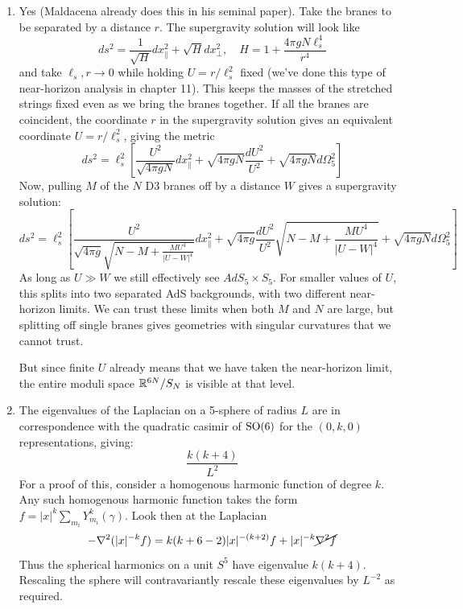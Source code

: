 \documentclass[11pt, class=article, crop=false]{standalone}
\begin{document}
\begin{enumerate}
	\item Yes (Maldacena already does this in his seminal paper). Take the branes to be separated by a distance $r$. The supergravity solution will look like
	\[
		ds^2 = \frac{1}{\sqrt{H}} dx_{\parallel}^2 + \sqrt{H} dx_\perp^2, \quad H = 1 + \frac{4 \pi g N \ell_s^4}{r^4}
	\]
	and take $\ell_s, r \to 0$ while holding $U = r/\ell_s^2$ fixed (we've done this type of near-horizon analysis in chapter 11). This keeps the masses of the stretched strings fixed even as we bring the branes together. If all the branes are coincident, the coordinate $r$ in the supergravity solution gives an equivalent coordinate $U = r/\ell_s^2$, giving the metric
	\[
		ds^2 = \ell_s^2 \left[ \frac{U^2}{\sqrt{4 \pi g N}} dx_\parallel^2 + \sqrt{4 \pi g N} \frac{dU^2}{U^2} + \sqrt{4 \pi g N} d\Omega_5^2 \right]
	\]
	Now, pulling $M$ of the $N$ D3 branes off by a distance $W$ gives a supergravity solution:
	\[
			ds^2 = \ell_s^2 \left[ \frac{U^2}{\sqrt{4 \pi g} \sqrt{N - M + \frac{M U^4}{|U - W|^4}}} dx_\parallel^2 + \sqrt{4 \pi g} \frac{dU^2}{U^2} \sqrt{N - M + \frac{M U^4}{|U - W|^4}} + \sqrt{4 \pi g N} d\Omega_5^2 \right]
	\]
	As long as $U \gg W$ we still effectively see $AdS_5 \times S_5$. For smaller values of $U$, this splits into two separated AdS backgrounds, with two different near-horizon limits. We can trust these limits when both $M$ and $N$ are large, but splitting off single branes gives geometries with singular curvatures that we cannot trust. 
	
	But since finite $U$ already means that we have taken the near-horizon limit, the entire moduli space $\mathbb{R}^{6N}/S_N$ is visible at that level.
	
	\item The eigenvalues of the Laplacian on a 5-sphere of radius $L$ are in correspondence with the quadratic casimir of $\mathrm{SO}(6)$ for the $(0, k, 0)$ representations, giving:
	\[
		\frac{k(k+4)}{L^2}
	\]
	For a proof of this, consider a homogenous harmonic function of degree $k$. Any such homogenous harmonic function takes the form $f = |x|^{k} \sum_{m_i} Y^k_{m_i}(\gamma)$. Look then at the Laplacian
	\[
		-\nabla^2 (|x|^{-k} f) = k (k + 6 - 2) |x|^{-(k+2)} f + |x|^{-k} \cancel{\nabla^2 f}
	\]
	Thus the spherical harmonics on a unit $S^5$ have eigenvalue $k(k+4)$. Rescaling the sphere will contravariantly rescale these eigenvalues by $L^{-2}$ as required.
	

\end{enumerate}
\end{document}
